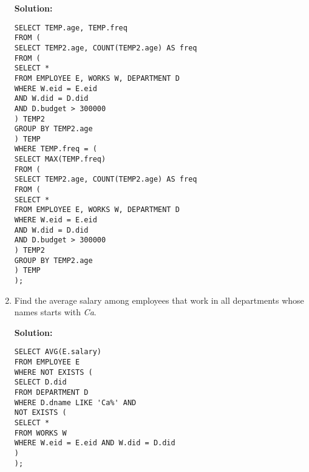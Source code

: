 \begin{enumerate}
\textbf{Solution:}

\begin{verbatim}
SELECT TEMP.age, TEMP.freq
FROM (
SELECT TEMP2.age, COUNT(TEMP2.age) AS freq
FROM (
SELECT *
FROM EMPLOYEE E, WORKS W, DEPARTMENT D
WHERE W.eid = E.eid
AND W.did = D.did
AND D.budget > 300000
) TEMP2
GROUP BY TEMP2.age
) TEMP
WHERE TEMP.freq = (
SELECT MAX(TEMP.freq)
FROM (
SELECT TEMP2.age, COUNT(TEMP2.age) AS freq
FROM (
SELECT *
FROM EMPLOYEE E, WORKS W, DEPARTMENT D
WHERE W.eid = E.eid
AND W.did = D.did
AND D.budget > 300000
) TEMP2
GROUP BY TEMP2.age
) TEMP
);
\end{verbatim}

\item Find the average salary among employees that work in all departments whose names starts with \textit{Ca}.

\textbf{Solution:}

\begin{verbatim}
SELECT AVG(E.salary)
FROM EMPLOYEE E
WHERE NOT EXISTS (
SELECT D.did
FROM DEPARTMENT D
WHERE D.dname LIKE 'Ca%' AND
NOT EXISTS (
SELECT *
FROM WORKS W
WHERE W.eid = E.eid AND W.did = D.did
)
);
\end{verbatim}

\end{enumerate}
